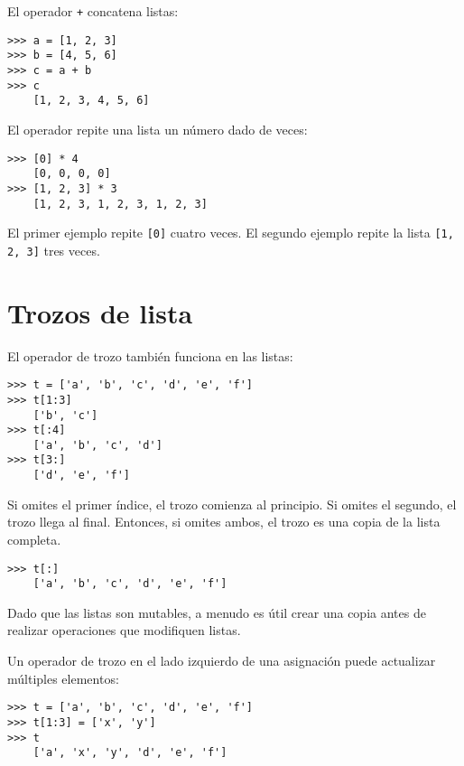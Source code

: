 \documentclass[10pt]{book}
\begin{document}
El operador {\tt +} concatena listas:

\begin{verbatim}
>>> a = [1, 2, 3]
>>> b = [4, 5, 6]
>>> c = a + b
>>> c
    [1, 2, 3, 4, 5, 6]
\end{verbatim}
%
El operador {\tt *} repite una lista un número dado de veces:

\begin{verbatim}
>>> [0] * 4
    [0, 0, 0, 0]
>>> [1, 2, 3] * 3
    [1, 2, 3, 1, 2, 3, 1, 2, 3]
\end{verbatim}
%
El primer ejemplo repite {\tt [0]} cuatro veces.  El segundo ejemplo
repite la lista {\tt [1, 2, 3]} tres veces.


\section{Trozos de lista}

El operador de trozo también funciona en las listas:

\begin{verbatim}
>>> t = ['a', 'b', 'c', 'd', 'e', 'f']
>>> t[1:3]
    ['b', 'c']
>>> t[:4]
    ['a', 'b', 'c', 'd']
>>> t[3:]
    ['d', 'e', 'f']
\end{verbatim}
%
Si omites el primer índice, el trozo comienza al principio.
Si omites el segundo, el trozo llega al final.  Entonces, si
omites ambos, el trozo es una copia de la lista completa.

\begin{verbatim}
>>> t[:]
    ['a', 'b', 'c', 'd', 'e', 'f']
\end{verbatim}
%
Dado que las listas son mutables, a menudo es útil crear una copia
antes de realizar operaciones que modifiquen listas.

Un operador de trozo en el lado izquierdo de una asignación
puede actualizar múltiples elementos:

\begin{verbatim}
>>> t = ['a', 'b', 'c', 'd', 'e', 'f']
>>> t[1:3] = ['x', 'y']
>>> t
    ['a', 'x', 'y', 'd', 'e', 'f']
\end{verbatim}
%
\end{document}
